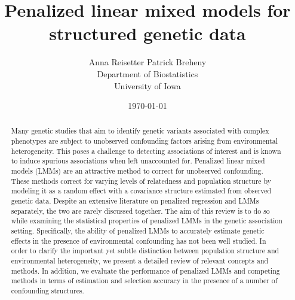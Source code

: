 \documentclass[a4paper]{article}
\title{Penalized linear mixed models for structured genetic data}
\author{Anna Reisetter \qquad Patrick Breheny\\
  Department of Biostatistics\\University of Iowa}
\date{\today}
\begin{document}
\maketitle

\begin{abstract}
Many genetic studies that aim to identify genetic variants associated with complex phenotypes are subject to unobserved confounding factors arising from environmental heterogeneity. This poses a challenge to detecting associations of interest and is known to induce spurious associations when left unaccounted for. Penalized linear mixed models (LMMs) are an attractive method to correct for unobserved confounding. These methods correct for varying levels of relatedness and population structure by modeling it as a random effect with a covariance structure estimated from observed genetic data. Despite an extensive literature on penalized regression and LMMs separately, the two are rarely discussed together. The aim of this review is to do so while examining the statistical properties of penalized LMMs in the genetic association setting. Specifically, the ability of penalized LMMs to accurately estimate genetic effects in the presence of environmental confounding has not been well studied. In order to clarify the important yet subtle distinction between population structure and environmental heterogeneity, we present a detailed review of relevant concepts and methods. In addition, we evaluate the performance of penalized LMMs and competing methods in terms of estimation and selection accuracy in the presence of a number of confounding structures.
\end{abstract}



\newpage



\newpage

\end{document}
